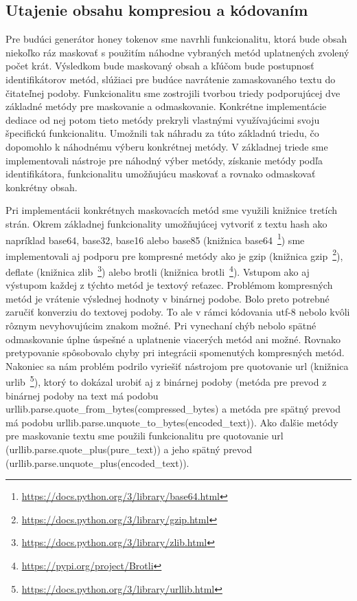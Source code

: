 \documentclass[conference, 11pt,slovak,a4paper,twoside]{IEEEtran}
\begin{document}
\subsection{Utajenie obsahu kompresiou a kódovaním} \label{contentConcealing}

Pre budúci generátor honey tokenov sme navrhli funkcionalitu, ktorá bude obsah niekoľko ráz maskovať s použitím náhodne vybraných metód uplatnených zvolený počet krát. Výsledkom bude maskovaný obsah a kľúčom bude postupnosť identifikátorov metód, slúžiaci pre budúce navrátenie zamaskovaného textu do čitateľnej podoby. Funkcionalitu sme zostrojili tvorbou triedy podporujúcej dve základné metódy pre maskovanie a odmaskovanie. Konkrétne implementácie dediace od nej potom tieto metódy prekryli vlastnými využívajúcimi svoju špecifickú funkcionalitu. Umožnili tak náhradu za túto základnú triedu, čo dopomohlo k náhodnému výberu konkrétnej metódy. V základnej triede sme implementovali nástroje pre náhodný výber metódy, získanie metódy podľa identifikátora, funkcionalitu umožňujúcu maskovať a rovnako odmaskovať konkrétny obsah.

Pri implementácii konkrétnych maskovacích metód sme využili knižnice tretích strán. Okrem základnej funkcionality umožňujúcej vytvoriť z textu hash ako napríklad base64, base32, base16 alebo base85 (knižnica base64~\footnote{\url{https://docs.python.org/3/library/base64.html}}) sme implementovali aj podporu pre kompresné metódy ako je gzip (knižnica gzip~\footnote{\url{https://docs.python.org/3/library/gzip.html}}), deflate (knižnica zlib~\footnote{\url{https://docs.python.org/3/library/zlib.html}}) alebo brotli (knižnica brotli~\footnote{\url{https://pypi.org/project/Brotli}}). Vstupom ako aj výstupom každej z týchto metód je textový reťazec. Problémom kompresných metód je vrátenie výslednej hodnoty v binárnej podobe. Bolo preto potrebné zaručiť konverziu do textovej podoby. To ale v rámci kódovania utf-8 nebolo kvôli rôznym nevyhovujúcim znakom možné. Pri vynechaní chýb nebolo spätné odmaskovanie úplne úspešné a uplatnenie viacerých metód ani možné. Rovnako pretypovanie spôsobovalo chyby pri integrácii spomenutých kompresných metód. Nakoniec sa nám problém podrilo vyriešiť nástrojom pre quotovanie url (knižnica urlib~\footnote{\url{https://docs.python.org/3/library/urllib.html}}), ktorý to dokázal urobiť aj z binárnej podoby (metóda pre prevod z binárnej podoby na text má podobu urllib.parse.quote\_from\_bytes(compressed\_bytes) a metóda pre spätný prevod má podobu urllib.parse.unquote\_to\_bytes(encoded\_text)). Ako ďalšie metódy pre maskovanie textu sme použili funkcionalitu pre quotovanie url (urllib.parse.quote\_plus(pure\_text)) a jeho spätný prevod (urllib.parse.unquote\_plus(encoded\_text)).
\end{document}
